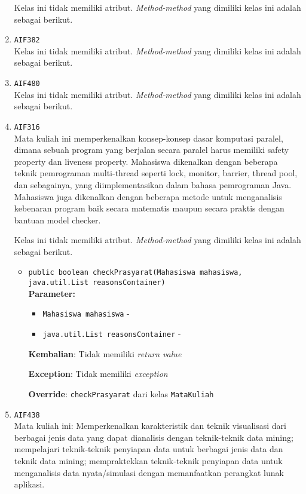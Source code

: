 \documentclass{article}
\begin{document}
\begin{enumerate}
Kelas ini tidak memiliki atribut. \textit{Method-method} yang dimiliki kelas ini adalah sebagai berikut.
\begin{itemize}
\end{itemize}
\item \texttt{AIF382}\\ 
Kelas ini tidak memiliki atribut. \textit{Method-method} yang dimiliki kelas ini adalah sebagai berikut.
\begin{itemize}
\end{itemize}
\item \texttt{AIF480}\\ 
Kelas ini tidak memiliki atribut. \textit{Method-method} yang dimiliki kelas ini adalah sebagai berikut.
\begin{itemize}
\end{itemize}
\item \texttt{AIF316}\\ 
Mata kuliah ini memperkenalkan konsep-konsep dasar komputasi paralel, dimana sebuah 
 program yang berjalan secara paralel harus memiliki safety property dan liveness property. 
 Mahasiswa dikenalkan dengan beberapa teknik pemrograman multi-thread
 seperti lock, monitor, barrier, thread pool, dan sebagainya, yang diimplementasikan 
 dalam bahasa pemrograman Java. Mahasiswa juga dikenalkan dengan beberapa metode untuk 
 menganalisis kebenaran program baik secara matematis maupun secara praktis dengan bantuan 
 model checker.

Kelas ini tidak memiliki atribut. \textit{Method-method} yang dimiliki kelas ini adalah sebagai berikut.
\begin{itemize}
\item \texttt{public boolean checkPrasyarat(Mahasiswa mahasiswa, java.util.List reasonsContainer)}\\ 


\textbf{Parameter:}\begin{itemize}
\item \texttt{Mahasiswa mahasiswa} - 
\item \texttt{java.util.List reasonsContainer} - 
\end{itemize}
\textbf{Kembalian}: Tidak memiliki \textit{return value}

\textbf{Exception}: Tidak memiliki \textit{exception}

\textbf{Override}: \texttt{checkPrasyarat} dari kelas \texttt{MataKuliah}

\end{itemize}
\item \texttt{AIF438}\\ 
Mata kuliah ini: Memperkenalkan karakteristik dan teknik visualisasi dari
 berbagai jenis data yang dapat dianalisis dengan teknik-teknik data mining;
 mempelajari teknik-teknik penyiapan data untuk berbagai jenis data dan teknik
 data mining; mempraktekkan teknik-teknik penyiapan data untuk menganalisis
 data nyata/simulasi dengan memanfaatkan perangkat lunak aplikasi.


\end{enumerate}
\end{document}
